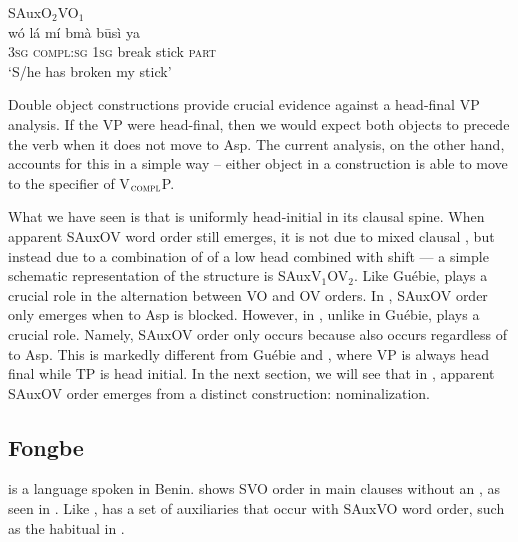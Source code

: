 \documentclass[output=paper]{LSP/langsci}
\begin{document}
\ex \label{ex:Gwari-DOC-O2VO1}{SAuxO$_2$VO$_1$}	\\
\gll w\'o l\'a m\'i bm\`a b\={u}s\`{i} ya \\
3\textsc{sg} \textsc{compl:sg} 1\textsc{sg} break stick \textsc{part} \\
\glt `S/he has broken my stick'	\hfill \citep[][93]{hyman1970}
\z

\z
Double object constructions provide crucial evidence against a head-final VP analysis. If the  VP were head-final, then we would expect both objects to precede the verb when it does not move to Asp. The current analysis, on the other hand, accounts for this in a simple way -- either object in a  construction is able to move to the specifier of V$_\textsc{compl}$P.

What we have seen is that  is uniformly head-initial in its clausal spine. When apparent SAuxOV word order still emerges, it is not due to mixed clausal , but instead due to a combination of  of a low  head combined with shift --- a simple schematic representation of the structure is SAuxV$_1$OV$_2$. Like Gu\'ebie,  plays a crucial role in the alternation between VO and OV orders. In , SAuxOV order only emerges when  to Asp is blocked. However, in , unlike in Gu\'ebie,  plays a crucial role. Namely, SAuxOV order only occurs because  also occurs regardless of  to Asp. This is markedly different from Gu\'ebie and , where VP is always head final while TP is head initial. In the next section, we will see that in , apparent SAuxOV order emerges from a distinct construction: nominalization. 

\subsection{Fongbe}

 is a  language spoken in Benin.  shows SVO order in main clauses without an , as seen in . Like ,  has a set of auxiliaries that occur with SAuxVO word order, such as the habitual in .%
\end{document}
